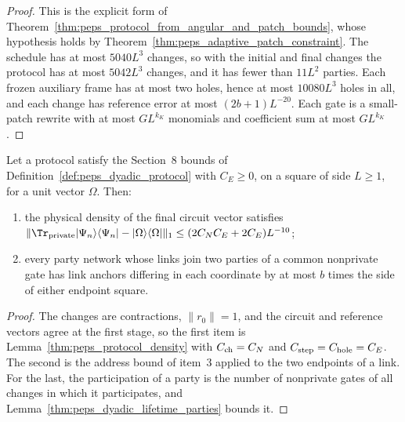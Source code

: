 \begin{proof}\leanok
    This is the explicit form of
    Theorem~\ref{thm:peps_protocol_from_angular_and_patch_bounds}, whose
    hypothesis holds by Theorem~\ref{thm:peps_adaptive_patch_constraint}. The
    schedule has at most $5040L^3$ changes, so with the initial and final
    changes the protocol has at most $5042L^3$ changes, and it has fewer than
    $11L^2$ parties. Each frozen auxiliary frame has at most two holes, hence at
    most $10080L^3$ holes in all, and each change has reference error at most
    $(2b+1)L^{-20}$. Each gate is a small-patch rewrite with at most $GL^{k_K}$
    monomials and coefficient sum at most $GL^{k_K}$.
\end{proof}

\begin{lemma}
    \label{thm:peps_dyadic_protocol_consequences}
    \leanok
    Let a protocol satisfy the Section~8 bounds of
    Definition~\ref{def:peps_dyadic_protocol} with $C_E\ge0$, on a square of side
    $L\ge1$, for a unit vector $\Omega$. Then:
    \begin{enumerate}
        \item the physical density of the final circuit vector satisfies
              $\lVert\Tr_{\rm private}|\Psi_n\rangle\langle\Psi_n|
                  -|\Omega\rangle\langle\Omega|\rVert_1\le(2C_NC_E+2C_E)L^{-10}$;
        \item every party network whose links join two parties of a common
              nonprivate gate has link anchors differing in each coordinate by
              at most $b$ times the side of either endpoint square.
    \end{enumerate}
\end{lemma}

\begin{proof}\leanok
    The changes are contractions, $\lVert r_0\rVert=1$, and the circuit and
    reference vectors agree at the first stage, so the first item is
    Lemma~\ref{thm:peps_protocol_density} with
    $C_{\rm ch}=C_N$ and $C_{\rm step}=C_{\rm hole}=C_E$. The second is the address bound of
    item~3 applied to the two endpoints of a link. For the last, the participation
    of a party is the number of nonprivate gates of all changes in which it
    participates, and Lemma~\ref{thm:peps_dyadic_lifetime_parties} bounds it.
\end{proof}

